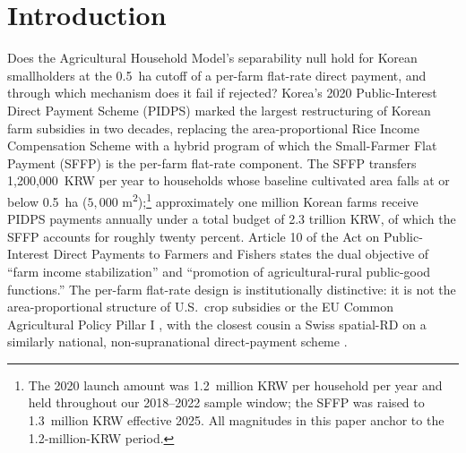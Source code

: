 \documentclass[12pt, a4paper]{article}
\begin{document}
\section{Introduction}
\label{sec:intro}

Does the Agricultural Household Model's separability null hold for Korean smallholders at the 0.5~ha cutoff of a per-farm flat-rate direct payment, and through which mechanism does it fail if rejected? Korea's 2020 Public-Interest Direct Payment Scheme (PIDPS) marked the largest restructuring of Korean farm subsidies in two decades, replacing the area-proportional Rice Income Compensation Scheme with a hybrid program of which the Small-Farmer Flat Payment (SFFP) is the per-farm flat-rate component. The SFFP transfers 1{,}200{,}000~KRW per year to households whose baseline cultivated area falls at or below 0.5~ha ($5{,}000$ m\textsuperscript{2});\footnote{The 2020 launch amount was 1.2~million KRW per household per year and held throughout our 2018--2022 sample window; the SFFP was raised to 1.3~million KRW effective 2025. All magnitudes in this paper anchor to the 1.2-million-KRW period.} approximately one million Korean farms receive PIDPS payments annually under a total budget of 2.3 trillion KRW, of which the SFFP accounts for roughly twenty percent. Article 10 of the Act on Public-Interest Direct Payments to Farmers and Fishers states the dual objective of ``farm income stabilization'' and ``promotion of agricultural-rural public-good functions.'' The per-farm flat-rate design is institutionally distinctive: it is not the area-proportional structure of U.S.\ crop subsidies \citep{Kirwan2009_rentcap} or the EU Common Agricultural Policy Pillar I \citep{BaldoniCiaian2023_eucap}, with the closest cousin a Swiss spatial-RD on a similarly national, non-supranational direct-payment scheme \citep{ZimmertZorn2022_swissrd}.
\end{document}
